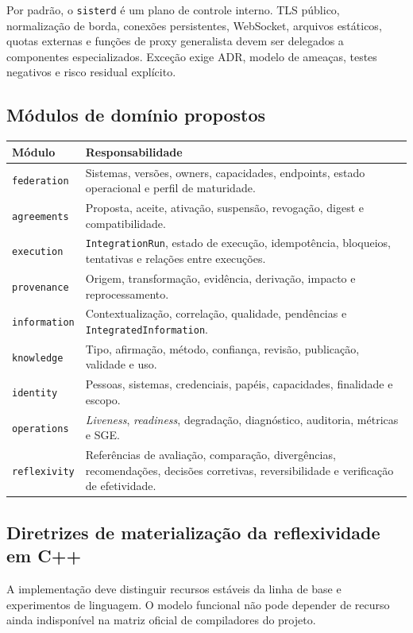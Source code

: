 \documentclass[11pt,a4paper,oneside]{article}
\begin{document}
Por padrão, o \texttt{sisterd} é um plano de controle interno. TLS público, normalização de borda, conexões persistentes, WebSocket, arquivos estáticos, quotas externas e funções de proxy generalista devem ser delegados a componentes especializados. Exceção exige ADR, modelo de ameaças, testes negativos e risco residual explícito.

\subsection{Módulos de domínio propostos}
\begin{tabularx}{\textwidth}{P{4.3cm}Y}
\toprule
\textbf{Módulo} & \textbf{Responsabilidade} \\
\midrule
\texttt{federation} & Sistemas, versões, owners, capacidades, endpoints, estado operacional e perfil de maturidade. \\
\texttt{agreements} & Proposta, aceite, ativação, suspensão, revogação, digest e compatibilidade. \\
\texttt{execution} & \texttt{IntegrationRun}, estado de execução, idempotência, bloqueios, tentativas e relações entre execuções. \\
\texttt{provenance} & Origem, transformação, evidência, derivação, impacto e reprocessamento. \\
\texttt{information} & Contextualização, correlação, qualidade, pendências e \texttt{IntegratedInformation}. \\
\texttt{knowledge} & Tipo, afirmação, método, confiança, revisão, publicação, validade e uso. \\
\texttt{identity} & Pessoas, sistemas, credenciais, papéis, capacidades, finalidade e escopo. \\
\texttt{operations} & \textit{Liveness}, \textit{readiness}, degradação, diagnóstico, auditoria, métricas e SGE. \\
\texttt{reflexivity} & Referências de avaliação, comparação, divergências, recomendações, decisões corretivas, reversibilidade e verificação de efetividade. \\
\bottomrule
\end{tabularx}


\subsection{Diretrizes de materialização da reflexividade em C++}
\label{sec:cpp-reflexividade}

A implementação deve distinguir recursos estáveis da linha de base e experimentos de linguagem. O modelo funcional não pode depender de recurso ainda indisponível na matriz oficial de compiladores do projeto.
\end{document}
